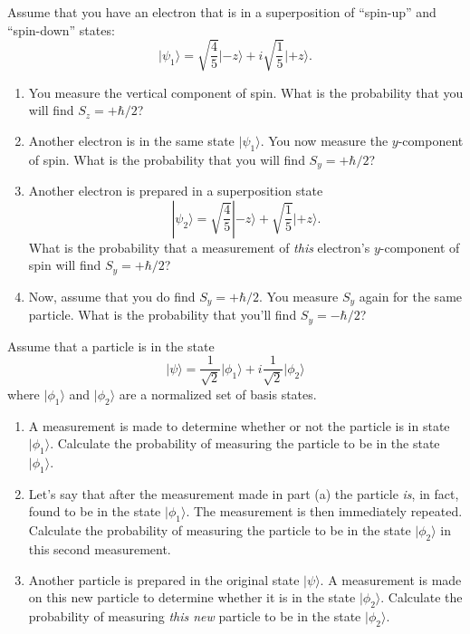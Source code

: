 \begin{problem}
Assume that you have an electron that is in a superposition of
``spin-up'' and ``spin-down'' states:
\[ \vert\psi_1\rangle = \sqrt{\frac{4}{5}}\vert\mbox{$-z$}\rangle + i 
\sqrt{\frac{1}{5}}\vert\mbox{$+z$}\rangle.  \]
	\begin{enumerate}
	\item You measure the vertical component of spin. What is the
	probability that you will find $S_z = + \hbar/2$? 
	\item Another electron is in the same state $|\psi_1\rangle$.    You now measure the
	$y$-component of spin. What is the probability that you will find
	$S_y = + \hbar/2$?
	\item Another electron is prepared in a superposition state 
\[ |\psi_2\rangle = \sqrt{\frac{4}{5}} |\mbox{$-z$}\rangle + 
        \sqrt{\frac{1}{5}}\vert\mbox{$+z$}\rangle.  \]	
        What is the probability that a measurement of
	{\em this} electron's $y$-component of spin will find 
        $S_y = + \hbar/2$?
	\item Now, assume that you do find $S_y = + \hbar/2$. You measure $S_y$
	again for the same particle. What is the probability that you'll 
        find $S_y = -\hbar/2$?
        \end{enumerate}
\label{prob:spin_iv}
\end{problem}

\begin{problem}
Assume that a particle is in the state
\[ \vert\mbox{$\psi$}\rangle = \frac{1}{\sqrt{2}} \vert\mbox{$\phi_1$}\rangle + i \frac{1}{\sqrt{2}} \vert\mbox{$\phi_2$}\rangle \]
where $\vert\mbox{$\phi_1$}\rangle$ and $\vert\mbox{$\phi_2$}\rangle$ are a normalized set of basis states.
\begin{enumerate}
\item A measurement is made to determine whether or not the particle is in state $\vert\mbox{$\phi_1$}\rangle$. Calculate the probability of measuring the particle to be in the state $\vert\mbox{$\phi_1$}\rangle$.
\item Let's say that after the measurement made in part (a) the particle {\it is}, in fact, found to be in the state $\vert\mbox{$\phi_1$}\rangle$. The measurement is then immediately repeated.  Calculate the probability of measuring the particle to be in the state $\vert\mbox{$\phi_2$}\rangle$ in this second measurement.
\item Another particle is prepared in the original state $\vert\mbox{$\psi$}\rangle$. A measurement is made on this new particle to determine whether it is in the state $\vert\mbox{$\phi_2$}\rangle$. Calculate the probability of measuring {\it this new} particle to be in the state $\vert\mbox{$\phi_2$}\rangle$.
\end{enumerate}
\end{problem}


